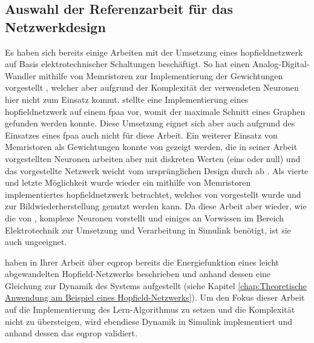 \subsection{Auswahl der Referenzarbeit für das Netzwerkdesign}

Es haben sich bereits einige Arbeiten mit der Umsetzung eines \gls{hopfieldnetzwerk} auf Basis elektrotechnischer Schaltungen beschäftigt. So hat \zb \citeauthor{Guo2015} einen Analog-Digital-Wandler mithilfe von Memristoren zur Implementierung der Gewichtungen vorgestellt \cite{Guo2015}, welcher aber aufgrund der Komplexität der verwendeten Neuronen hier nicht zum Einsatz kommt. \citeauthor{Mathews2023} stellte \citeyear{Mathews2023} eine Implementierung eines \gls{hopfieldnetzwerk} auf einem \gls{fpaa} vor, womit der maximale Schnitt eines Graphen gefunden werden konnte. Diese Umsetzung eignet sich aber auch aufgrund des Einsatzes eines \gls{fpaa} auch nicht für diese Arbeit. Ein weiterer Einsatz von Memristoren als Gewichtungen konnte von \citeauthor{Hu2015} gezeigt werden, die in seiner Arbeit vorgestellten Neuronen arbeiten aber mit diskreten Werten (eins oder null) und das vorgestellte Netzwerk weicht vom ursprünglichen Design durch \citeauthor{Hopfield1982} ab \cite{Hu2015}. Als vierte und letzte Möglichkeit wurde wieder ein mithilfe von Memristoren implementiertes \gls{hopfieldnetzwerk} betrachtet, welches \citeyear{Hong2020} von \citeauthor{Hong2020} vorgestellt wurde und zur Bildwiederherstellung genutzt werden kann. Da diese Arbeit aber wieder, wie die von \cite{Guo2015}, komplexe Neuronen vorstellt und einiges an Vorwissen im Bereich Elektrotechnik zur Umsetzung und Verarbeitung in Simulink benötigt, ist sie auch ungeeignet.

\citeauthor{Scellier2017} haben in Ihrer Arbeit über \gls{eqprop} bereits die Energiefunktion eines leicht abgewandelten Hopfield-Netzwerks beschrieben und anhand dessen eine Gleichung zur Dynamik des Systems aufgestellt (siehe Kapitel \ref{chap:Theoretische Anwendung am Beispiel eines Hopfield-Netzwerks}). Um den Fokus dieser Arbeit auf die Implementierung des Lern-Algorithmus zu setzen und die Komplexität nicht zu übersteigen, wird ebendiese Dynamik in Simulink implementiert und anhand dessen das \gls{eqprop} validiert.

